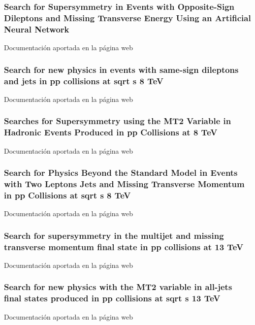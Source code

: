 \documentclass[a4paper, 11pt, twoside, openright]{report}
\begin{document}
\subsubsection{Search for Supersymmetry in Events with Opposite-Sign Dileptons and Missing Transverse Energy Using an Artificial Neural Network}
Documentación aportada en la página web
%
\subsubsection{Search for new physics in events with same-sign dileptons and jets in pp collisions at sqrt s 8 TeV}
Documentación aportada en la página web
%
\subsubsection{Searches for Supersymmetry using the MT2 Variable in Hadronic Events Produced in pp Collisions at 8 TeV}
Documentación aportada en la página web
%
\subsubsection{Search for Physics Beyond the Standard Model in Events with Two Leptons Jets and Missing Transverse Momentum in pp Collisions at sqrt s 8 TeV}
Documentación aportada en la página web
%
\subsubsection{Search for supersymmetry in the multijet and missing transverse momentum final state in pp collisions at 13 TeV}
%
Documentación aportada en la página web
\subsubsection{Search for new physics with the MT2 variable in all-jets final states produced in pp collisions at sqrt s 13 TeV}
Documentación aportada en la página web
%
\end{document}
